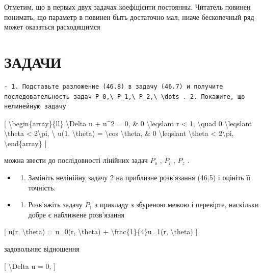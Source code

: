 \documentclass[
]{article}
\providecommand{\tightlist}{%
  \setlength{\itemsep}{0pt}\setlength{\parskip}{0pt}}
\begin{document}
{Отметим, що в первых двух задачах коефіцієнти постоянны. Читатель
повинен понимать, що параметр в повинен быть достаточно мал, ниаче
бескопечный ряд может оказаться расходящимся

\section{ЗАДАЧИ}\label{ux437ux430ux434ux430ux447ux438-20}

\begin{verbatim}
- 1. Подставьте разложение (46.8) в задачу (46.7) и получите последовательность задач P_0,\ P_1,\ P_2,\ \dots . 2. Покажите, що нелинейную задачу
\end{verbatim}

{[} \textbackslash begin\{array\}\{ll\} \textbackslash Delta u + u\^{}2
= 0, \& 0 \textbackslash leqslant r \textless{} 1, \textbackslash quad 0
\textbackslash leqslant \textbackslash theta \textless{}
2\textbackslash pi, \textbackslash{} u(1, \textbackslash theta) =
\textbackslash cos \textbackslash theta, \& 0 \textbackslash leqslant
\textbackslash theta \textless{} 2\textbackslash pi,
\textbackslash end\{array\} {]}

можна звести до послідовності лінійних задач \(P_{o}\) , \(P_{i}\) ,
\(P_{z}\) .

\begin{itemize}
\tightlist
\item
  \begin{enumerate}
  \def\labelenumi{\arabic{enumi}.}
  \setcounter{enumi}{2}
  \tightlist
  \item
    Замініть нелінійну задачу 2 на приблизне розв'язання (46,5) і
    оцініть її точність.
  \end{enumerate}
\item
  \begin{enumerate}
  \def\labelenumi{\arabic{enumi}.}
  \setcounter{enumi}{3}
  \tightlist
  \item
    Розв'яжіть задачу \(P_1\) з прикладу з збуреною межою і перевірте,
    наскільки добре є наближене розв'язання
  \end{enumerate}
\end{itemize}

{[} u(r, \textbackslash theta) = u\_0(r, \textbackslash theta) +
\textbackslash frac\{1\}\{4\}u\_1(r, \textbackslash theta) {]}

задовольняє відношення

{[} \textbackslash Delta u = 0, {]}

}
\end{document}
